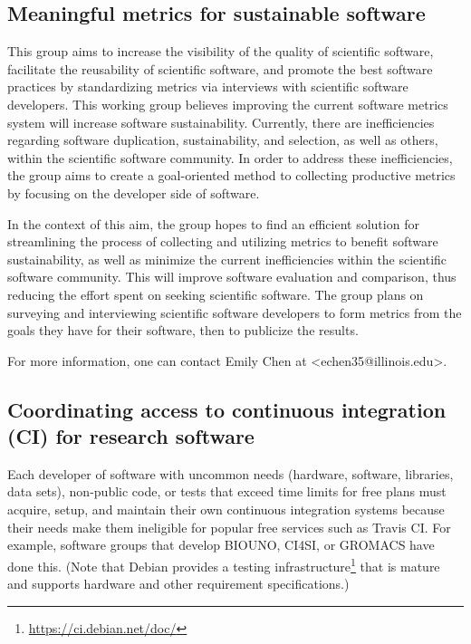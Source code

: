 \documentclass[11pt, oneside]{amsart}
\newcommand{\note}[1]{ {\textcolor{blueish}    { ***Note:      #1 }}}
\begin{document}
\subsection{Meaningful metrics for sustainable software}
\label{sec:metrics}


This group aims to increase the visibility of the quality of scientific software, facilitate the reusability of scientific software, and promote the best software practices by standardizing metrics via interviews with scientific software developers. This working group believes improving the current software metrics system will increase software sustainability. Currently, there are inefficiencies regarding software duplication, sustainability, and selection, as well as others, within the scientific software community. In order to address these inefficiencies, the group aims to create a goal-oriented method to collecting productive metrics by focusing on the developer side of software.

In the context of this aim, the group hopes to find an efficient solution for streamlining the process of collecting and utilizing metrics to benefit software sustainability, as well as minimize the current inefficiencies within the scientific software community. This will improve software evaluation and comparison, thus reducing the effort spent on seeking scientific software.
%
The group plans on surveying and interviewing scientific software developers to form metrics from the goals they have for their software, then to publicize the results.

For more information, one can contact Emily Chen at <echen35@illinois.edu>.



\subsection{Coordinating access to continuous integration (CI) for research software}
\label{sec:access}


Each developer of software with uncommon needs (hardware, software, libraries, data sets), non-public code, or tests that exceed time limits for free plans must acquire, setup, and maintain their own continuous integration systems because their needs make them ineligible for popular free services such as Travis CI.  For example, software groups that develop BIOUNO, CI4SI, or GROMACS have done this.
(Note that Debian provides a testing infrastructure\footnote{\url{https://ci.debian.net/doc/}} that is mature and supports hardware and other requirement specifications.)
\end{document}

